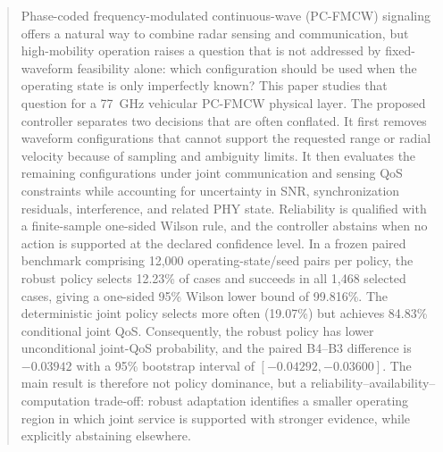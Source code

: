 \begin{abstract}
Phase-coded frequency-modulated continuous-wave (PC-FMCW) signaling offers a natural way to combine radar sensing and communication, but high-mobility operation raises a question that is not addressed by fixed-waveform feasibility alone: which configuration should be used when the operating state is only imperfectly known? This paper studies that question for a \SI{77}{GHz} vehicular PC-FMCW physical layer. The proposed controller separates two decisions that are often conflated. It first removes waveform configurations that cannot support the requested range or radial velocity because of sampling and ambiguity limits. It then evaluates the remaining configurations under joint communication and sensing QoS constraints while accounting for uncertainty in SNR, synchronization residuals, interference, and related PHY state. Reliability is qualified with a finite-sample one-sided Wilson rule, and the controller abstains when no action is supported at the declared confidence level. In a frozen paired benchmark comprising 12,000 operating-state/seed pairs per policy, the robust policy selects 12.23\% of cases and succeeds in all 1,468 selected cases, giving a one-sided 95\% Wilson lower bound of 99.816\%. The deterministic joint policy selects more often (19.07\%) but achieves 84.83\% conditional joint QoS. Consequently, the robust policy has lower unconditional joint-QoS probability, and the paired B4--B3 difference is $-0.03942$ with a 95\% bootstrap interval of $[-0.04292,-0.03600]$. The main result is therefore not policy dominance, but a reliability--availability--computation trade-off: robust adaptation identifies a smaller operating region in which joint service is supported with stronger evidence, while explicitly abstaining elsewhere.
\end{abstract}
